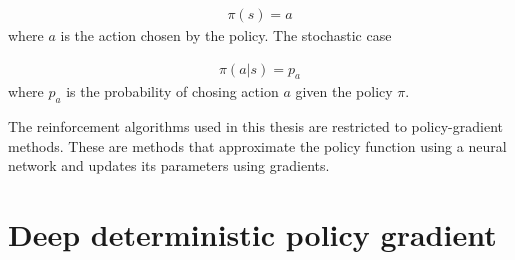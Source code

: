 \documentclass[class=book, crop=false]{standalone}
\begin{document}
\begin{equation}
   \begin{aligned}\label{eq:theory:policy_function_deterministic}
\pi(s) = a
\end{aligned} 
\end{equation}
where $a$ is the action chosen by the policy. The stochastic case 


\begin{equation}
   \begin{aligned}\label{eq:theory:policy_function_stochastic}
\pi(a|s) = p_{a}
\end{aligned} 
\end{equation}
where $p_{a}$ is the probability of chosing action $a$ given the policy $\pi$.


The reinforcement algorithms used in this thesis are restricted to policy-gradient methods. These are methods that approximate the policy function using a neural network and updates its parameters using gradients. 



\section{Deep deterministic policy gradient}
\end{document}
